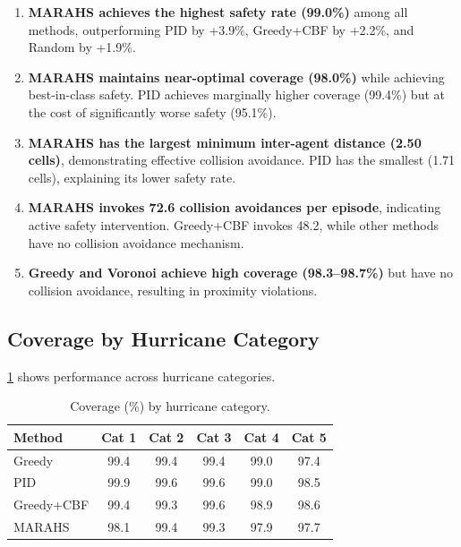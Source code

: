 \documentclass[11pt,twocolumn]{article}
\providecommand{\Cref}[1]{\ref{#1}}
\theoremstyle{definition}
\begin{document}
\begin{enumerate}[leftmargin=*]
    \item \textbf{MARAHS achieves the highest safety rate (99.0\%)} among all methods, outperforming PID by +3.9\%, Greedy+CBF by +2.2\%, and Random by +1.9\%.
    
    \item \textbf{MARAHS maintains near-optimal coverage (98.0\%)} while achieving best-in-class safety. PID achieves marginally higher coverage (99.4\%) but at the cost of significantly worse safety (95.1\%).
    
    \item \textbf{MARAHS has the largest minimum inter-agent distance (2.50 cells)}, demonstrating effective collision avoidance. PID has the smallest (1.71 cells), explaining its lower safety rate.
    
    \item \textbf{MARAHS invokes 72.6 collision avoidances per episode}, indicating active safety intervention. Greedy+CBF invokes 48.2, while other methods have no collision avoidance mechanism.
    
    \item \textbf{Greedy and Voronoi achieve high coverage (98.3--98.7\%)} but have no collision avoidance, resulting in proximity violations.
\end{enumerate}

\subsection{Coverage by Hurricane Category}
\label{sec:category_results}

\Cref{tab:category_results} shows performance across hurricane categories.

\begin{table}[t]
\centering
\caption{Coverage (\%) by hurricane category.}
\label{tab:category_results}
\small
\begin{tabular}{lccccc}
\toprule
\textbf{Method} & \textbf{Cat 1} & \textbf{Cat 2} & \textbf{Cat 3} & \textbf{Cat 4} & \textbf{Cat 5} \\
\midrule
Greedy    & 99.4 & 99.4 & 99.4 & 99.0 & 97.4 \\
PID       & 99.9 & 99.6 & 99.6 & 99.0 & 98.5 \\
Greedy+CBF& 99.4 & 99.3 & 99.6 & 98.9 & 98.6 \\
MARAHS    & 98.1 & 99.4 & 99.3 & 97.9 & 97.7 \\
\bottomrule
\end{tabular}
\end{table}
\end{document}
